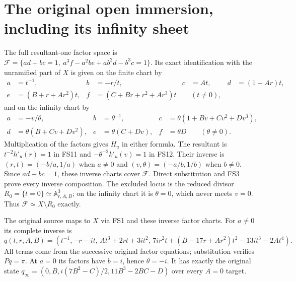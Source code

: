 \section{The original open immersion, including its infinity sheet}
The full resultant-one factor space is
$\mathcal F=\{ad+bc=1,\ a^3f-a^2be+ab^2d-b^3c=1\}$.
Its exact identification with the unramified part of $X$
is given on the finite chart by
\begin{align}
a&=t^{-1},&b&=-r/t,&c&=At,&d&=(1+Ar)t,\nonumber\\
e&=(B+r+Ar^2)t,&f&=(C+Br+r^2+Ar^3)t&& (t\ne0),
\tag{FS11}
\end{align}
and on the infinity chart by
\begin{align}
a&=-v/\theta,&b&=\theta^{-1},&
c&=\theta(1+Bv+Cv^2+Dv^3),\nonumber\\
d&=\theta(B+Cv+Dv^2),&
e&=\theta(C+Dv),&f&=\theta D
\qquad(\theta\ne0).
\tag{FS12}
\end{align}
Multiplication of the factors gives $H_u$ in either formula.
The resultant is $t^{-2}h'_u(r)=1$ in FS11 and
$-\theta^{-2}k'_u(v)=1$ in FS12.
Their inverse is $(r,t)=(-b/a,1/a)$ when $a\ne0$ and
$(v,\theta)=(-a/b,1/b)$ when $b\ne0$.
Since $ad+bc=1$, these inverse charts cover $\mathcal F$.
Direct substitution and FS3 prove every inverse composition.
The excluded locus is the reduced divisor
$R_0=\{t=0\}\simeq\mathbb A^3_{r,A,B}$; on the infinity
chart it is $\theta=0$, which never meets $v=0$.
Thus $\mathcal F\simeq X\setminus R_0$ exactly.

The original source maps to $X$ via FS1 and these inverse
factor charts. For $a\ne0$ its complete inverse is
\begin{equation}
q(t,r,A,B)=\left(t^{-1},-r-it,\,
At^3+2rt+3it^2,\,
7ir^2t+(B-17r+Ar^2)t^2-13it^3-2At^4\right).
\tag{FS13}
\end{equation}
All terms come from the successive original factor equations;
substitution verifies $Pq=\pi$.
At $a=0$ its factors have $b=i$, hence $\theta=-i$.
It has exactly the original state
$q_\infty=(0,B,i(7B^2-C)/2,11B^3-2BC-D)$ over
every $A=0$ target.

